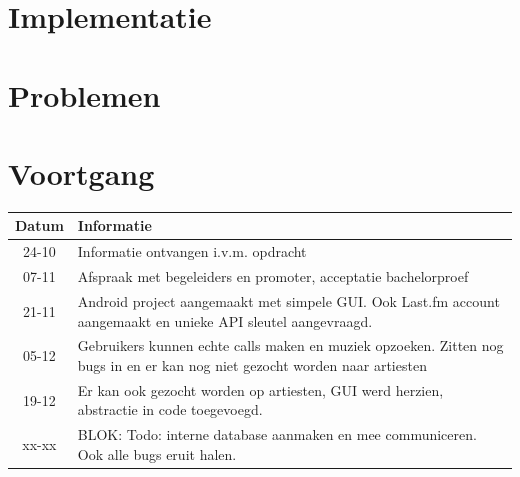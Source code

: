 \documentclass[11pt,a4paper]{article}
\begin{document}
\section{Implementatie}
\section{Problemen}
\section{Voortgang}
	\begin{tabular}{| c | p{\linewidth} | }
	\hline
	Datum & Informatie \\ \hline \hline 
	24-10 & Informatie ontvangen i.v.m. opdracht \\ \hline
	07-11 & Afspraak met begeleiders en promoter, acceptatie bachelorproef \\ \hline
	21-11 & Android project aangemaakt met simpele GUI. Ook Last.fm account aangemaakt en unieke API sleutel aangevraagd. \\ \hline
	05-12 & Gebruikers kunnen echte calls maken en muziek opzoeken. Zitten nog bugs in en er kan nog niet gezocht worden naar artiesten \\ \hline
	19-12 & Er kan ook gezocht worden op artiesten, GUI werd herzien, abstractie in code toegevoegd. \\ \hline
	xx-xx & BLOK: Todo: interne database aanmaken en mee communiceren. Ook alle bugs eruit halen. \\ \hline
	
	\end{tabular}
\end{document}
